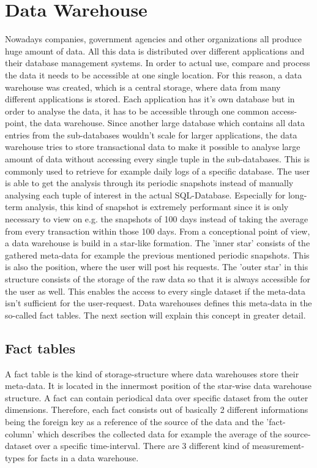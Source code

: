 \documentclass[12pt,a4paper,oneside,
liststotoc, 					%
bibtotoc,						%
titlepage, 						%
headsepline, 					%
BCOR6mm,						%
openany,							%
]{scrreprt}
\begin{document}
\section{Data Warehouse}\label{dw}
Nowadays companies, government agencies and other organizations all produce huge amount of data. All this data is distributed over different applications and their database management systems. In order to actual use, compare and process the data it needs to be accessible at one single location.
For this reason, a data warehouse was created, which is a central storage, where data from many different applications is stored. Each application has it's own database but in order to analyse the data, it has to be accessible through one common access-point, the data warehouse. Since another large database which contains all data entries from the sub-databases wouldn't scale for larger applications, the data warehouse tries to store transactional data to make it possible to analyse large amount of data without accessing every single tuple in the sub-databases. This is commonly used to retrieve for example daily logs of a specific database. The user is able to get the analysis through its periodic snapshots instead of manually analysing each tuple of interest in the actual SQL-Database. Especially for long-term analysis, this kind of snapshot is extremely performant since it is only necessary to view on e.g. the snapshots of 100 days instead of taking the average from every transaction within those 100 days.
From a conceptional point of view, a data warehouse is build in a star-like formation. The 'inner star' consists of the gathered meta-data for example the previous mentioned periodic snapshots. This is also the position, where the user will post his requests. The 'outer star' in this structure consists of the storage of the raw data so that it is always accessible for the user as well. This enables the access to every single dataset if the meta-data isn't sufficient for the user-request.
Data warehouses defines this meta-data in the so-called fact tables. The next section will explain this concept in greater detail.
\subsection{Fact tables}\label{factTables}
A fact table is the kind of storage-structure where data warehouses store their meta-data. It is located in the innermost position of the star-wise data warehouse structure. A fact can contain periodical data over specific dataset from the outer dimensions. Therefore, each fact consists out of basically 2 different informations being the foreign key as a reference of the source of the data and the 'fact-column' which describes the collected data for example the average of the source-dataset over a specific time-interval. There are 3 different kind of measurement-types for facts in a data warehouse.
\end{document}
